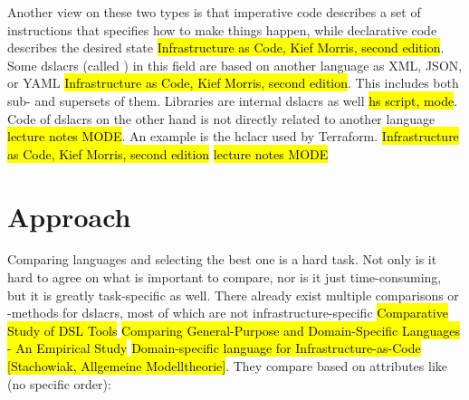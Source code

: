 \newline
Another view on these two types is that imperative code describes a set of instructions that specifies how to make things happen, while declarative code describes the desired state \hl{Infrastructure as Code, Kief Morris, second edition}.
\newline
Some \gls{dslacr}s (called ) in this field are based on another language as XML, JSON, or YAML \hl{Infrastructure as Code, Kief Morris, second edition}. This includes both sub- and supersets of them. Libraries are internal \gls{dslacr}s as well \hl{hs script, mode}. Code of  \gls{dslacr}s on the other hand is not directly related to another language \hl{lecture notes MODE}. An example is the \gls{hclacr} used by Terraform. \hl{Infrastructure as Code, Kief Morris, second edition} \hl{lecture notes MODE}


\section{Approach}
Comparing languages and selecting the best one is a hard task. Not only is it hard to agree on what is important to compare, nor is it just time-consuming, but it is greatly task-specific as well.
There already exist multiple comparisons or -methods for \gls{dslacr}s, most of which are not infrastructure-specific \hl{Comparative Study of DSL Tools} \hl{Comparing General-Purpose and Domain-Specific Languages - An Empirical Study} \hl{Domain-specific language for Infrastructure-as-Code} \hl{[Stachowiak, Allgemeine Modelltheorie]}. %
They compare based on attributes like (no specific order):

